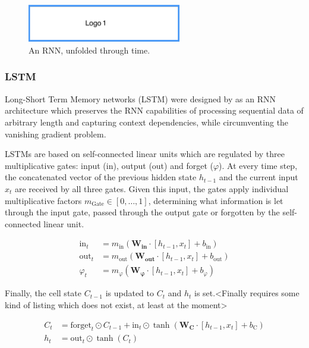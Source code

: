 \begin{figure}[htb]
 \centering
 \includegraphics[width=0.6\textwidth]{fig/logo1}
 \caption[Unfolded RNN]{An RNN, unfolded through time.}
\label{fig:unrolledRNN}
\end{figure}


\subsubsection{LSTM}\label{LSTM}

Long-Short Term Memory networks (LSTM) were designed by \cite{Hochreiter1997} as an RNN architecture which preserves the RNN capabilities of processing sequential data of arbitrary length and capturing context dependencies, while circumventing the vanishing gradient problem.

LSTMs are based on self-connected linear units which are regulated by three multiplicative gates: input (in), output (out) and forget ($\varphi$). At every time step, the concatenated vector of the previous hidden state $h_{t-1}$ and the current input $x_{t}$ are received by all three gates. Given this input, the gates apply individual multiplicative factors $m_{\text{Gate}} \in [0, \dots, 1]$, determining what information is let through the input gate, passed through the output gate or forgotten by the self-connected linear unit.

\begin{align*}
\text{in}_{t} &= m_{\text{in}} (\boldsymbol{W_{\text{in}}} \cdot [h_{t-1},x_{t}] + b_{\text{in}}) \\
\text{out}_{t} &= m_{\text{out}} (\boldsymbol{W_{\text{out}}} \cdot [h_{t-1},x_{t}] + b_{\text{out}}) \\
\varphi_{t} &= m_{\varphi} (\boldsymbol{W_{\varphi}} \cdot [h_{t-1},x_{t}] + b_{\varphi})
\end{align*}

Finally, the cell state $C_{t-1}$ is updated to $C_{t}$ and $h_{t}$ is set.<Finally requires some kind of listing which does not exist, at least at the moment>

\begin{align*}
C_{t} &= \text{forget}_{t} \odot C_{t-1} + \text{in}_{t} \odot \tanh (\boldsymbol{W_{C}} \cdot [h_{t-1},x_{t}] + b_{\text{C}}) \\
h_{t} &= \text{out}_{t} \odot \tanh (C_{t})
\end{align*}

